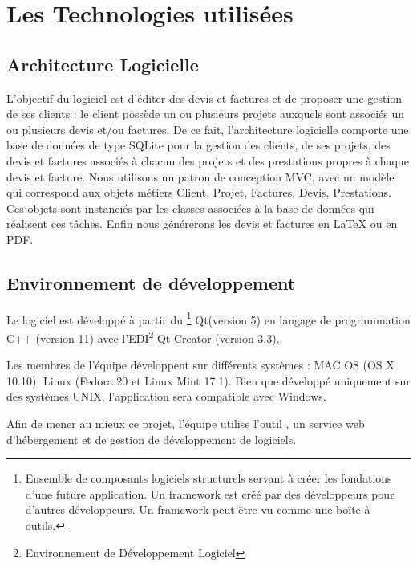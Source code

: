 \section{Les Technologies utilisées}
\subsection{Architecture Logicielle}
L’objectif du logiciel est d’éditer des devis et factures et de proposer une gestion de ses clients : le client possède un ou plusieurs projets auxquels sont associés un ou plusieurs devis et/ou factures. 
De ce fait, l’architecture logicielle comporte une base de données de type SQLite pour la gestion des clients, de ses projets, des devis et factures associés à chacun des projets et des prestations propres à chaque devis et facture. 
Nous utilisons un patron de conception MVC, avec un modèle qui correspond aux objets métiers Client, Projet, Factures, Devis, Prestations. Ces objets sont instanciés par les classes associées à la base de données qui réalisent ces tâches.
Enfin nous générerons les devis et factures en LaTeX ou en PDF.

\subsection{Environnement de développement}
Le logiciel est développé à partir du 
\footnote{Ensemble de composants logiciels structurels servant à créer les fondations d'une future application. Un framework est créé par des développeurs pour d'autres développeurs. Un framework peut être vu comme une boîte à outils.} 
Qt(version 5)
en langage de programmation C++ (version 11) avec l'EDI\footnote{Environnement de Développement Logiciel} Qt Creator (version 3.3). 

Les membres de l’équipe développent sur différents systèmes : MAC OS (OS X 10.10), Linux (Fedora 20 et Linux Mint 17.1). Bien que développé uniquement sur des systèmes UNIX, l’application sera compatible avec Windows. 

Afin de mener au mieux ce projet, l’équipe utilise l’outil , un service web d’hébergement et de gestion de développement de logiciels. 

